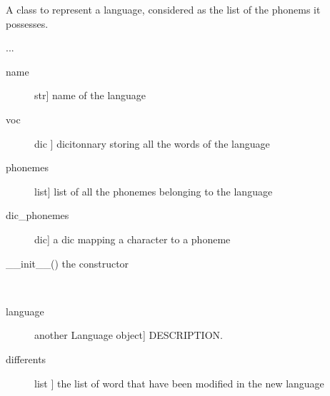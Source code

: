 \documentclass[letterpaper,10pt,english]{sphinxmanual}
\begin{document}
\begin{fulllineitems}
\label{\detokenize{index:Language.Language}}
\sphinxAtStartPar
A class to represent a language, considered as the list of the phonems it possesses.

\sphinxAtStartPar
...
\begin{description}
\item[{name}] \leavevmode{[}str{]}
\sphinxAtStartPar
name of the language

\item[{voc}] \leavevmode{[}dic {]}
\sphinxAtStartPar
dicitonnary storing all the words of the language

\item[{phonemes}] \leavevmode{[}list{]}
\sphinxAtStartPar
list of all the phonemes belonging to the language

\item[{dic\_phonemes}] \leavevmode{[}dic{]}
\sphinxAtStartPar
a dic mapping a character to a phoneme

\end{description}

\sphinxAtStartPar
\_\_init\_\_() the constructor

\begin{fulllineitems}
\label{\detokenize{index:Language.Language.compare}}~\begin{description}
\item[{language}] \leavevmode{[}another Language object{]}
\sphinxAtStartPar
DESCRIPTION.

\end{description}
\begin{description}
\item[{differents}] \leavevmode{[}list {]}
\sphinxAtStartPar
the list of word that have been modified in the new language

\end{description}

\end{fulllineitems}


\end{fulllineitems}
\end{document}
